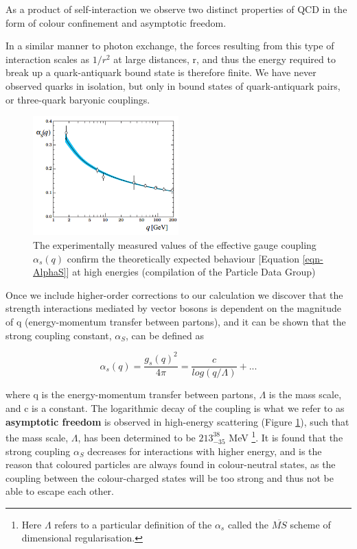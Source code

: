 As a product of self-interaction we observe two distinct properties of QCD in the form of colour confinement and asymptotic freedom. 

In a similar manner to photon exchange, the forces resulting from this type of interaction scales as $1/r^2$ at large distances, r, and thus the energy required to break up a quark-antiquark bound state is therefore finite. We have never observed quarks in isolation, but only in bound states of quark-antiquark pairs, or three-quark baryonic couplings.  

\begin{figure}
\begin{center}
\includegraphics[width=0.5\textwidth]{Figures/AlphaS.png}
\end{center}
\caption{The experimentally measured values of the effective gauge coupling $\alpha_s(q)$ confirm the theoretically expected behaviour [Equation \ref{eqn-AlphaS}] at high energies (compilation of the Particle Data Group) \cite{AlphaS}}
\label{fig-AlphaS}
\end{figure}

Once we include higher-order corrections to our calculation we discover that the strength interactions mediated by vector bosons is dependent 
on the magnitude of q (energy-momentum transfer between partons), and it can be shown that the strong coupling constant, $\alpha_S$, can be 
defined as

\begin{equation} \label{eqn-AlphaS}
\alpha_s(q) = \frac{g_s(q)^2}{4\pi} = \frac{c}{log(q/\Lambda)} + ...
\end{equation}

where q is the energy-momentum transfer between partons, $\Lambda$ is the mass scale, and c is a constant. The logarithmic decay of the 
coupling is what we refer to as \textbf{asymptotic freedom} is observed in high-energy scattering (Figure \ref{fig-AlphaS}), such that the mass 
scale, $\Lambda$, has been determined to be $213^{38}_{-35}$ MeV \cite{Bethke:2000ai}\footnote{Here $\Lambda$ refers to a particular definition 
of the $\alpha_s$ called the $\overline{MS}$ scheme of dimensional regularisation.}. It is found that the strong coupling $\alpha_S$ decreases 
for interactions with higher energy, and is the reason that coloured particles are always found in colour-neutral states, as the coupling 
between the colour-charged states will be too strong and thus not be able to escape each other.

